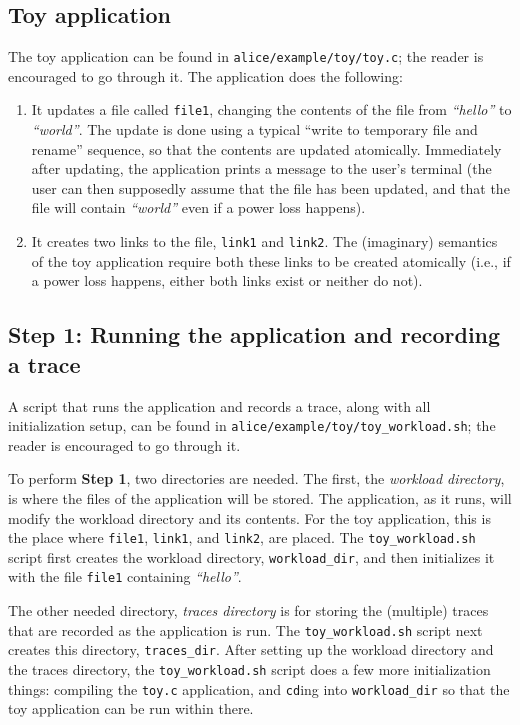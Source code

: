 \documentclass[oneside]{memoir}
\begin{document}
\subsection{Toy application}
The toy application can be found in \verb;alice/example/toy/toy.c;; the reader is encouraged to go through it. The application does the following:
\begin{enumerate}
\item It updates a file called \verb;file1;, changing the contents of the file from \textit{``hello''} to \textit{``world''}. The update is done using a typical ``write to temporary file and rename'' sequence, so that the contents are updated atomically. Immediately after updating, the application prints a message to the user's terminal (the user can then supposedly assume that the file has been updated, and that the file will contain \textit{``world''} even if a power loss happens).
\item It creates two links to the file, \verb;link1; and \verb;link2;. The (imaginary) semantics of the toy application require both these links to be created atomically (i.e., if a power loss happens, either both links exist or neither do not).
\end{enumerate}

\subsection{Step 1: Running the application and recording a trace}
A script that runs the application and records a trace, along with all initialization setup, can be found in \verb;alice/example/toy/toy_workload.sh;; the reader is encouraged to go through it. 

To perform \textbf{Step 1}, two directories are needed. The first, the \textit{workload directory}, is where the files of the application will be stored. The application, as it runs, will modify the workload directory and its contents. For the toy application, this is the place where \verb;file1;, \verb;link1;, and \verb;link2;, are placed. The \verb;toy_workload.sh; script first creates the workload directory, \verb;workload_dir;, and then initializes it with the file \verb;file1; containing \textit{``hello''}.

The other needed directory, \textit{traces directory} is for storing the (multiple) traces that are recorded as the application is run. The \verb;toy_workload.sh; script next creates this directory, \verb;traces_dir;. After setting up the workload directory and the traces directory, the \verb;toy_workload.sh; script does a few more initialization things: compiling the \verb;toy.c; application, and \verb;cd;ing into \verb;workload_dir; so that the toy application can be run within there.
\end{document}

